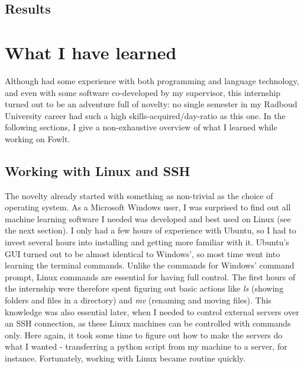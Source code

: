 \documentclass[12pt]{article}
\let\stdsection\section
\renewcommand\section{\newpage\stdsection}
\begin{document}
\subsection{Results}

\section{What I have learned}
Although had some experience with both programming and language technology, and even with some software co-developed by my supervisor, this internship turned out to be an adventure full of novelty: no single semester in my Radboud University career had such a high skills-acquired/day-ratio as this one. In the following sections, I give a non-exhaustive overview of what I learned while working on Fowlt.

\subsection{Working with Linux and SSH}
The novelty already started with something as non-trivial as the choice of operating system. As a Microsoft Windows user, I was surprised to find out all machine learning software I needed was developed and best used on Linux (see the next section). I only had a few hours of experience with Ubuntu, so I had to invest several hours into installing and getting more familiar with it. Ubuntu's GUI turned out to be almost identical to Windows', so most time went into learning the terminal commands. Unlike the commands for Windows' command prompt, Linux commands are essential for having full control. The first hours of the internship were therefore spent figuring out basic actions like \emph{ls} (showing folders and files in a directory) and \emph{mv} (renaming and moving files). This knowledge was also essential later, when I needed to control external servers over an SSH connection, as these Linux machines can be controlled with commands only. Here again, it took some time to figure out how to make the servers do what I wanted - transferring a python script from my machine to a server, for instance. Fortunately, working with Linux became routine quickly.

\end{document}
